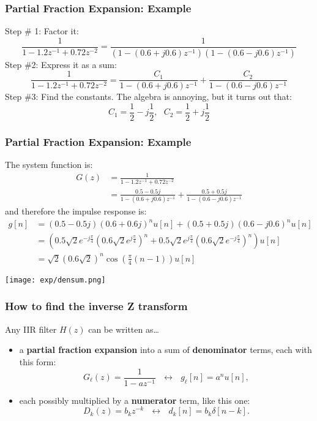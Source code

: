 \documentclass{beamer}
\begin{document}
\begin{frame}
  \frametitle{Partial Fraction Expansion: Example}
  Step \# 1:  Factor it:
  \begin{displaymath}
    \frac{1}{1-1.2z^{-1}+0.72z^{-2}}=
    \frac{1}{\left(1-(0.6+j0.6)z^{-1}\right)\left(1-(0.6-j0.6)z^{-1}\right)}
  \end{displaymath}
  Step \#2: Express it as a  sum:
  \begin{displaymath}
    \frac{1}{1-1.2z^{-1}+0.72z^{-2}}=
    \frac{C_1}{1-(0.6+j0.6)z^{-1}}+\frac{C_2}{1-(0.6-j0.6)z^{-1}}
  \end{displaymath}
  Step \#3: Find the constants.  The algebra is annoying, but it turns out that:
  \begin{displaymath}
    C_1=\frac{1}{2}-j\frac{1}{2},~~~
    C_2=\frac{1}{2}+j\frac{1}{2}
  \end{displaymath}
\end{frame}

\begin{frame}
  \frametitle{Partial Fraction Expansion: Example}
  The system function is:
  \begin{align*}
    G(z) &= \frac{1}{1-1.2z^{-1}+0.72z^{-2}}\\
    &=\frac{0.5-0.5j}{1-(0.6+j0.6)z^{-1}}+\frac{0.5+0.5j}{1-(0.6-j0.6)z^{-1}}
  \end{align*}
  and therefore the impulse response is:
  \begin{align*}
    g[n] &= (0.5-0.5j)(0.6+0.6j)^nu[n]+(0.5+0.5j)(0.6-j0.6)^nu[n]\\
    &= \left(0.5\sqrt{2}e^{-j\frac{\pi}{4}}\left(0.6\sqrt{2}e^{j\frac{\pi}{4}}\right)^n+
    0.5\sqrt{2}e^{j\frac{\pi}{4}}\left(0.6\sqrt{2}e^{-j\frac{\pi}{4}}\right)^n\right)u[n]\\
    &= \sqrt{2}(0.6\sqrt{2})^n \cos\left(\frac{\pi}{4}(n-1)\right)u[n]
  \end{align*}
\end{frame}

\begin{frame}
  \centerline{\texttt{[image: exp/densum.png]}}
\end{frame}

\begin{frame}
  \frametitle{How to find the inverse Z transform}

  Any IIR filter $H(z)$ can be written as\ldots
  \begin{itemize}
  \item a {\bf partial fraction expansion} into a sum of {\bf
    denominator} terms, each with this form:
    \begin{displaymath}
      G_\ell(z)=\frac{1}{1-az^{-1}}~~~\leftrightarrow~~~g_\ell[n]= a^nu[n],
    \end{displaymath}
  \item each possibly multiplied by a {\bf numerator} term, like this one:
    \begin{displaymath}
      D_k(z)=b_kz^{-k}~~~\leftrightarrow~~~d_k[n]=b_k\delta[n-k].
    \end{displaymath}
  \end{itemize}
\end{frame}
\end{document}
